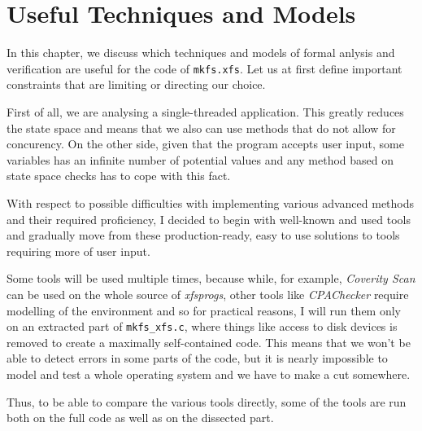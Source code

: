 
\chapter{Useful Techniques and Models}\label{chap:techniques}
In this chapter, we discuss which techniques and models of formal anlysis and verification are useful for the code of {\tt mkfs.xfs}. Let us at first define important constraints that are limiting or directing our choice.

First of all, we are analysing a single-threaded application. This greatly reduces the state space and means that we also can use methods that do not allow for concurency. On the other side, given that the program accepts user input, some variables has an infinite number of potential values and any method based on state space checks has to cope with this fact.

With respect to possible difficulties with implementing various advanced methods and their required proficiency, I decided to begin with well-known and used tools and gradually move from these production-ready, easy to use solutions to tools requiring more of user input.

Some tools will be used multiple times, because while, for example, {\em Coverity Scan} can be used on the whole source of {\em xfsprogs}, other tools like {\em CPAChecker} require modelling of the environment and so for practical reasons, I will run them only on an extracted part of {\tt mkfs\_xfs.c}, where things like access to disk devices is removed to create a maximally self-contained code. This means that we won't be able to detect errors in some parts of the code, but it is nearly impossible to model and test a whole operating system and we have to make a cut somewhere. 

Thus, to be able to compare the various tools directly, some of the tools are run both on the full code as well as on the dissected part.
